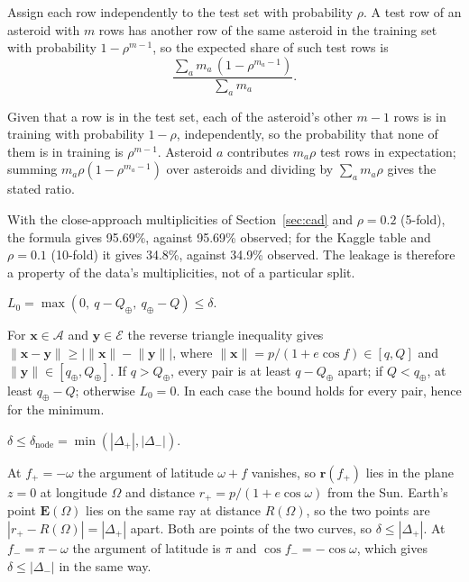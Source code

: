 \begin{proposition}\label{prop:leak}
Assign each row independently to the test set with probability $\rho$. A test row of an asteroid with $m$ rows has another row of the same asteroid in the training set with probability $1 - \rho^{m-1}$, so the expected share of such test rows is
\[
\frac{\sum_a m_a\,(1 - \rho^{m_a - 1})}{\sum_a m_a}.
\]
\end{proposition}
\begin{IEEEproof}
Given that a row is in the test set, each of the asteroid's other $m - 1$ rows is in training with probability $1 - \rho$, independently, so the probability that none of them is in training is $\rho^{m-1}$. Asteroid $a$ contributes $m_a\rho$ test rows in expectation; summing $m_a\rho(1 - \rho^{m_a-1})$ over asteroids and dividing by $\sum_a m_a\rho$ gives the stated ratio.
\end{IEEEproof}
With the close-approach multiplicities of Section~\ref{sec:cad} and $\rho = 0.2$ (5-fold), the formula gives 95.69\%, against 95.69\% observed; for the Kaggle table and $\rho = 0.1$ (10-fold) it gives 34.8\%, against 34.9\% observed. The leakage is therefore a property of the data's multiplicities, not of a particular split.

\begin{lemma}\label{lem:radial}
$L_0 = \max(0,\ q - Q_\oplus,\ q_\oplus - Q) \le \delta$.
\end{lemma}
\begin{IEEEproof}
For $\mathbf{x}\in\mathcal{A}$ and $\mathbf{y}\in\mathcal{E}$ the reverse triangle inequality gives $\lVert\mathbf{x} - \mathbf{y}\rVert \ge \bigl|\lVert\mathbf{x}\rVert - \lVert\mathbf{y}\rVert\bigr|$, where $\lVert\mathbf{x}\rVert = p/(1 + e\cos f) \in [q, Q]$ and $\lVert\mathbf{y}\rVert \in [q_\oplus, Q_\oplus]$. If $q > Q_\oplus$, every pair is at least $q - Q_\oplus$ apart; if $Q < q_\oplus$, at least $q_\oplus - Q$; otherwise $L_0 = 0$. In each case the bound holds for every pair, hence for the minimum.
\end{IEEEproof}

\begin{lemma}\label{lem:node}
$\delta \le \delta_{\mathrm{node}} = \min(|\Delta_+|, |\Delta_-|)$.
\end{lemma}
\begin{IEEEproof}
At $f_+ = -\omega$ the argument of latitude $\omega + f$ vanishes, so $\mathbf{r}(f_+)$ lies in the plane $z = 0$ at longitude $\Omega$ and distance $r_+ = p/(1 + e\cos\omega)$ from the Sun. Earth's point $\mathbf{E}(\Omega)$ lies on the same ray at distance $R(\Omega)$, so the two points are $|r_+ - R(\Omega)| = |\Delta_+|$ apart. Both are points of the two curves, so $\delta \le |\Delta_+|$. At $f_- = \pi - \omega$ the argument of latitude is $\pi$ and $\cos f_- = -\cos\omega$, which gives $\delta \le |\Delta_-|$ in the same way.
\end{IEEEproof}


